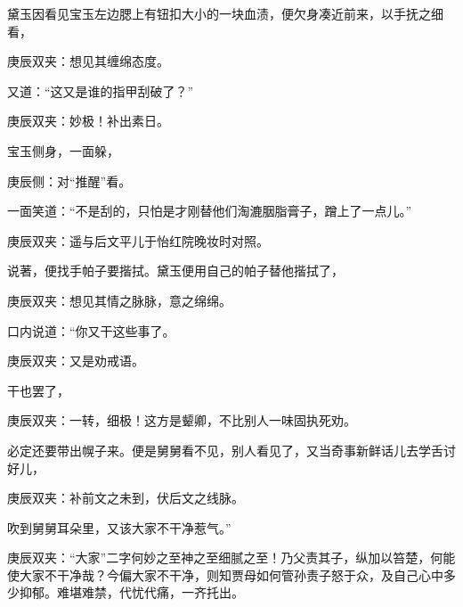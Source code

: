 \begin{parag}
    黛玉因看见宝玉左边腮上有钮扣大小的一块血渍，便欠身凑近前来，以手抚之细看，\begin{note}庚辰双夹：想见其缠绵态度。\end{note}又道：“这又是谁的指甲刮破了？”\begin{note}庚辰双夹：妙极！补出素日。\end{note}宝玉侧身，一面躲，\begin{note}庚辰侧：对“推醒”看。\end{note}一面笑道：“不是刮的，只怕是才刚替他们淘漉胭脂膏子，蹭上了一点儿。”\begin{note}庚辰双夹：遥与后文平儿于怡红院晚妆时对照。\end{note}说著，便找手帕子要揩拭。黛玉便用自己的帕子替他揩拭了，\begin{note}庚辰双夹：想见其情之脉脉，意之绵绵。\end{note}口内说道：“你又干这些事了。\begin{note}庚辰双夹：又是劝戒语。\end{note}干也罢了，\begin{note}庚辰双夹：一转，细极！这方是颦卿，不比别人一味固执死劝。\end{note}必定还要带出幌子来。便是舅舅看不见，别人看见了，又当奇事新鲜话儿去学舌讨好儿，\begin{note}庚辰双夹：补前文之未到，伏后文之线脉。\end{note}吹到舅舅耳朵里，又该大家不干净惹气。”\begin{note}庚辰双夹：“大家”二字何妙之至神之至细腻之至！乃父责其子，纵加以笞楚，何能使大家不干净哉？今偏大家不干净，则知贾母如何管孙责子怒于众，及自己心中多少抑郁。难堪难禁，代忧代痛，一齐托出。\end{note}
\end{parag}


